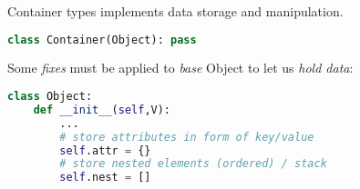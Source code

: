 \clearpage{}\secdown

Container types implements data storage and manipulation.

\begin{lstlisting}[language=Python]
class Container(Object): pass
\end{lstlisting}

\noindent
Some \emph{fixes} must be applied to \emph{base} Object to let us \emph{hold
data}:

\begin{lstlisting}[language=Python]
class Object:
	def __init__(self,V):
		...
		# store attributes in form of key/value
		self.attr = {}
		# store nested elements (ordered) / stack
		self.nest = []
\end{lstlisting}





\secup
